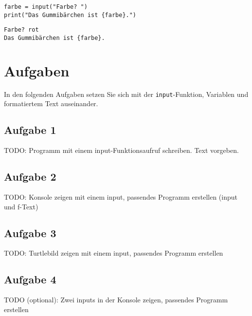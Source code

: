 \begin{lstlisting}[caption={Der Text wird so \textbf{nicht} korrekt formatiert. (\graybgtexttt{f-text\_bsp\_4.py}).}, label={lst-f-text-example-4}]
farbe = input("Farbe? ")
print("Das Gummibärchen ist {farbe}.")
\end{lstlisting}

\begin{lstlisting}[caption={Die Ausgabe entspricht $1:1$ dem Text, jedes Zeichen wird ausgegeben.}, label=lst-f-text-example-output-2, language=output]
Farbe? rot
Das Gummibärchen ist {farbe}.
\end{lstlisting}

\section{Aufgaben}

In den folgenden Aufgaben setzen Sie sich mit der \lstinline{input}-Funktion, Variablen und formatiertem Text auseinander.

\subsection{Aufgabe 1}

TODO: Programm mit einem input-Funktionsaufruf schreiben. Text vorgeben.

\subsection{Aufgabe 2}

TODO: Konsole zeigen mit einem input, passendes Programm erstellen (input und f-Text)

\subsection{Aufgabe 3}

TODO: Turtlebild zeigen mit einem input, passendes Programm erstellen

\subsection{Aufgabe 4}

TODO (optional): Zwei inputs in der Konsole zeigen, passendes Programm erstellen